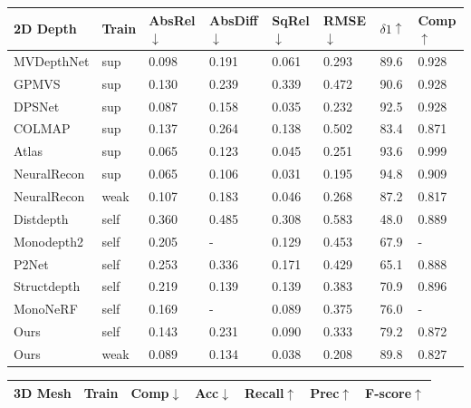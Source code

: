 \begin{table}[]
\setlength\tabcolsep{1pt}
\footnotesize
\begin{tabular}{llllllll}
\hline
\textbf{2D Depth}         & Train        & AbsRel$\downarrow$ & AbsDiff$\downarrow$ & SqRel$\downarrow$ & RMSE$\downarrow$  & \textbf{$\delta1\uparrow$}  & Comp$\uparrow$  \\ \hline
MVDepthNet\cite{mvdepthnet}     & sup         & 0.098   & 0.191    & 0.061  & 0.293 & 89.6 &  0.928 \\
GPMVS\cite{gpmvs}          & sup          & 0.130   & 0.239    & 0.339  & 0.472 & 90.6 & 0.928 \\
DPSNet\cite{dpsnet}         & sup          & 0.087   & 0.158    & 0.035  & 0.232 & 92.5 & 0.928 \\
COLMAP\cite{colmap}         & sup          & 0.137   & 0.264    & 0.138  & 0.502 & 83.4 & 0.871 \\
Atlas\cite{atlas}          & sup          & 0.065   & 0.123    & 0.045  & 0.251 & 93.6 & 0.999 \\
NeuralRecon\cite{neucon}    & sup          & 0.065   & 0.106    & 0.031  & 0.195 & 94.8 & 0.909 \\
NeuralRecon\cite{neucon}    & weak         & 0.107   & 0.183    & 0.046  & 0.268 & 87.2 & 0.817 \\
\hline
Distdepth\cite{distdepth}   & self      & 0.360   & 0.485    & 0.308  & 0.583 & 48.0 & 0.889 \\
Monodepth2\cite{monodepth2}   & self      & 0.205   & -    & 0.129  & 0.453 & 67.9 & - \\
P2Net\cite{p2net}   & self               & 0.253   & 0.336    & 0.171  & 0.429 & 65.1 & 0.888 \\
Structdepth\cite{structdepth}   & self      & 0.219   & 0.139    & 0.139  & 0.383 & 70.9 & 0.896 \\
MonoNeRF\cite{mononerf}   & self         & 0.169   & -    & 0.089  & 0.375 & 76.0 & - \\
Ours  & self                    &0.143    & 0.231    & 0.090  & 0.333 & 79.2 & 0.872 \\
Ours  & weak                    &0.089    & 0.134    & 0.038  & 0.208 & 89.8 & 0.827 \\\hline
\end{tabular}
\setlength\tabcolsep{3.5pt}
\begin{tabular}{lllllll}
\textbf{3D Mesh}         & Train        & Comp$\downarrow$  & Acc$\downarrow$   & Recall$\uparrow$ & Prec$\uparrow$  & \textbf{F-score$\uparrow$} \\ \hline

\end{tabular}
\end{table}
